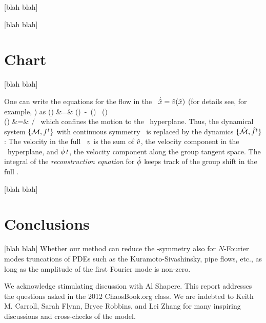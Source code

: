 \documentclass[aip,cha,
reprint,
secnumarabic,
nofootinbib, tightenlines,
nobibnotes, showkeys, showpacs,
groupedaddress,
]{revtex4-1}
\begin{document}
 [blah blah]

 [blah blah]

\section{Chart}
\label{s:slice}

 [blah blah]

One can write the equations for the flow in the \reducedsp\
$\dot{\hat{x}} = \hat{v}(\hat{x})$ (for details see, for example,
\refref{DasBuch}) as
\bea
\velRed(\sspRed) &=& \vel(\sspRed)
     \,-\, \dot{\gSpace}(\sspRed) \, \groupTan(\sspRed)
\label{2modesEqMotMFrame}\\
\dot{\gSpace}(\sspRed) &=& \braket{\vel(\sspRed)}{\sliceTan{}}
                       /\braket{\groupTan(\sspRed)}{\sliceTan{}}
\,
\label{2modesreconstrEq}
\eea
which confines the motion to the \slice\ hyperplane. Thus, the dynamical
system $\{{\cal M},f^t\}$ with continuous symmetry \Group\ is replaced by
the {\reducedsp} dynamics $\{\hat{\cal M},\hat{f}^t\}$: The velocity in the
full \statesp\ $v$ is the sum of $\hat{v}$, the velocity component in
the \slice\ hyperplane, and $\dot{{\bf \phi}}\,t$, the velocity
component along the group tangent space. The integral of the {\em
reconstruction equation} for $\dot{{\bf \phi}}$ keeps track of the group
shift in the full \statesp.


 [blah blah]


\section{Conclusions}
\label{s:concl}

 [blah blah]
Whether our method can reduce
the -symmetry also for $N$-Fourier modes truncations of PDEs such as
the Kuramoto-Sivashinsky, pipe flows, etc., as long as the amplitude of
the first Fourier mode is non-zero.


\begin{acknowledgments}
We acknowledge stimulating discussion with Al Shapere.
This report addresses the questions asked in
the 2012 ChaosBook.org class.
We are indebted to Keith M. Carroll, Sarah Flynn,
Bryce Robbins,
and
Lei Zhang
for many inspiring discussions and cross-checks of the model.
\end{acknowledgments}



\end{document}
